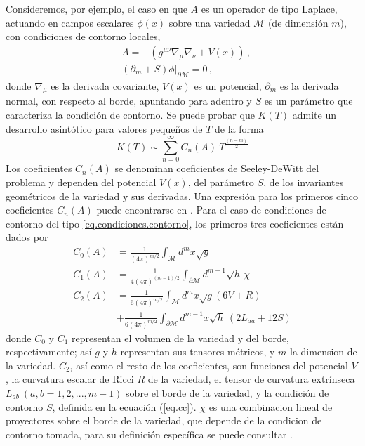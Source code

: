 Consideremos, por ejemplo, el caso en que $A$ es un operador de tipo Laplace, actuando en campos escalares $\phi(x)$ sobre una variedad $\mathcal{M}$  (de dimensión $m$), con condiciones de contorno locales,
\begin{align}\label{eq.cc}
&A = - \left(
			g ^{\mu \nu} \nabla _{\mu} \nabla _{\nu} + V(x)	\right) \,,\\[2mm]
\label{eq.condiciones.contorno}						
&\left (\partial _m + S \right) \phi | _{\partial \mathcal{M}} = 0\,,
\end{align}
donde $\nabla _{\mu}$ es la derivada covariante, $V(x)$ es un potencial, $\partial _m$ es la derivada normal, con respecto al borde, apuntando para adentro y $S$ es un parámetro que caracteriza la condición de contorno. Se puede probar \cite{10.2307/2373309,10.2307/2373078} que $K(T)$ admite un desarrollo asintótico para valores pequeños de $T$  de la forma
\begin{equation}
K(T) \sim 
\sum _{n=0} ^{\infty}
C _n (A) \ 
T^{\frac{(n-m)}{2}} 
\label{eq.heat.expansion}
\end{equation}
Los coeficientes $C_n(A)$ se denominan coeficientes de Seeley-DeWitt del problema y dependen del potencial $V(x)$, del parámetro $S$, de los invariantes geométricos de la variedad y sus derivadas. Una expresión para los primeros cinco coeficientes $C _n (A) $ puede encontrarse en \cite{Vassilevich:2003xt}. Para el caso de condiciones de contorno del tipo \ref{eq.condiciones.contorno}, los primeros tres coeficientes están dados por
\begin{align}
\label{C_0}
C _0 (A) &= \frac{1}{(4 \pi ) ^{m/2} }  \int  _{\mathcal{M}} d ^m x \sqrt{g}  \\[2mm]
C _1 (A) &= \frac{ 1 }{4 (4 \pi ) ^{(m-1)/2} } \int _{\partial \mathcal{M} } d ^{m-1} \sqrt{h} 
\, \chi
\label{C _1}
\\[2mm]
C _2 (A) &= \frac{ 1 }{6 (4 \pi) ^{m/2} } 
					\int _{\mathcal{M}} d ^m x\sqrt{g} (6 V + R)  
\nonumber
					\\
& + \frac{ 1 }{6 (4 \pi) ^{m/2} } 
					\int _{\partial \mathcal{M} } d ^{m-1} x 
				\sqrt{h} \ ( 2 L _{aa} + 12 S )
\label{coef}
\end{align} 
donde $C _0$ y $C _1$ representan el volumen de la variedad y del borde, respectivamente; así $g$ y $h$ representan sus tensores métricos, y $m$ la dimension de la variedad. $C _2$, así como el resto de los coeficientes, son funciones del potencial $V$, la curvatura escalar de Ricci $R$ de la variedad, el tensor de curvatura extrínseca $L _{ab } \ (a,b = 1,2,...,m-1)$ sobre el borde de la variedad, y la condición de contorno $S$, definida en la ecuación (\ref{eq.cc}). $\chi$ es una combinacion lineal de proyectores sobre el borde de la variedad, que depende de la condicion de contorno tomada, para su definición específica se puede consultar \cite{Vassilevich:2003xt}.


